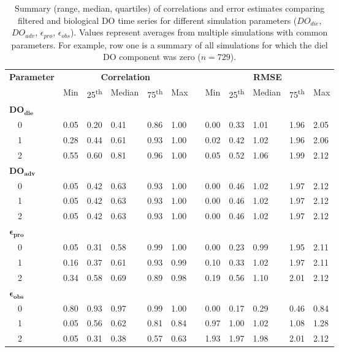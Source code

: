 \documentclass[letterpaper,12pt,oneside]{article}\usepackage[]{graphicx}\usepackage[]{color}
\begin{document}
\begin{table}[h]
\caption{Summary (range, median, quartiles) of correlations and error estimates comparing filtered and biological \ac{DO} time series for different simulation parameters ($DO_{die}$, $DO_{adv}$, $\epsilon_{pro}$, $\epsilon_{obs}$).  Values represent averages from multiple simulations with common parameters.  For example, row one is a summary of all simulations for which the diel \ac{DO} component was zero ($n=729$).\label{tab:dtd_perf1}} 
\begin{center}
\begin{tabular}{llllllclllll}
\hline\hline
\multicolumn{1}{l}{\bfseries Parameter}&\multicolumn{5}{c}{\bfseries Correlation}&\multicolumn{1}{c}{\bfseries }&\multicolumn{5}{c}{\bfseries RMSE}\tabularnewline
\cline{2-6} \cline{8-12}
\multicolumn{1}{l}{}&\multicolumn{1}{c}{Min}&\multicolumn{1}{c}{25\textsuperscript{th}}&\multicolumn{1}{c}{Median}&\multicolumn{1}{c}{75\textsuperscript{th}}&\multicolumn{1}{c}{Max}&\multicolumn{1}{c}{}&\multicolumn{1}{c}{Min}&\multicolumn{1}{c}{25\textsuperscript{th}}&\multicolumn{1}{c}{Median}&\multicolumn{1}{c}{75\textsuperscript{th}}&\multicolumn{1}{c}{Max}\tabularnewline
\hline
{\bfseries $\boldsymbol{DO_{die}}$}&&&&&&&&&&&\tabularnewline
~~0&0.05&0.20&0.41&0.86&1.00&&0.00&0.33&1.01&1.96&2.05\tabularnewline
~~1&0.28&0.44&0.61&0.93&1.00&&0.02&0.42&1.02&1.96&2.06\tabularnewline
~~2&0.55&0.60&0.81&0.96&1.00&&0.05&0.52&1.06&1.99&2.12\tabularnewline
\hline
{\bfseries $\boldsymbol{DO_{adv}}$}&&&&&&&&&&&\tabularnewline
~~0&0.05&0.42&0.63&0.93&1.00&&0.00&0.46&1.02&1.97&2.12\tabularnewline
~~1&0.05&0.42&0.63&0.93&1.00&&0.00&0.46&1.02&1.97&2.12\tabularnewline
~~2&0.05&0.42&0.63&0.93&1.00&&0.00&0.46&1.02&1.97&2.12\tabularnewline
\hline
{\bfseries $\boldsymbol{\epsilon_{pro}}$}&&&&&&&&&&&\tabularnewline
~~0&0.05&0.31&0.58&0.99&1.00&&0.00&0.23&0.99&1.95&2.11\tabularnewline
~~1&0.16&0.37&0.61&0.93&0.99&&0.10&0.33&1.02&1.97&2.11\tabularnewline
~~2&0.34&0.58&0.69&0.89&0.98&&0.19&0.56&1.10&2.01&2.12\tabularnewline
\hline
{\bfseries $\boldsymbol{\epsilon_{obs}}$}&&&&&&&&&&&\tabularnewline
~~0&0.80&0.93&0.97&0.99&1.00&&0.00&0.17&0.29&0.46&0.84\tabularnewline
~~1&0.05&0.56&0.62&0.81&0.84&&0.97&1.00&1.02&1.08&1.28\tabularnewline
~~2&0.05&0.31&0.38&0.57&0.63&&1.93&1.97&1.98&2.01&2.12\tabularnewline
\hline
\end{tabular}\end{center}

\end{table}
\end{document}

